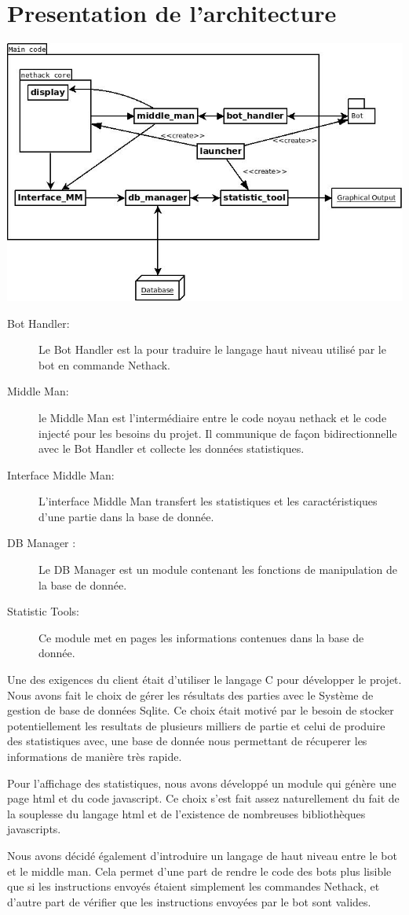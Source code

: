 \section{Presentation de l'architecture}

\includegraphics[width=140mm]{Images/new_archi.jpeg}

\begin{description}
\item[Bot Handler: ] Le Bot Handler est la pour traduire le langage haut niveau utilisé par le bot en commande Nethack.
\item[Middle Man: ] le Middle Man est l'intermédiaire entre le code noyau nethack et le code injecté pour les besoins du projet. Il communique de façon bidirectionnelle avec le Bot Handler et collecte les données statistiques.
\item[Interface Middle Man: ] L'interface Middle Man transfert les statistiques et les caractéristiques d'une partie dans la base de donnée.
\item[DB Manager :] Le DB Manager est un module contenant les fonctions de manipulation de la base de donnée.
\item[Statistic Tools:] Ce module met en pages les informations contenues dans la base de donnée.  
\end{description}

Une des exigences du client était d'utiliser le langage C pour développer le projet. Nous avons fait le choix de gérer les résultats des parties avec le Système de gestion de base de données Sqlite. Ce choix était motivé par le besoin de stocker potentiellement les resultats de plusieurs milliers de partie et celui de produire des statistiques avec, une base de donnée nous permettant de récuperer les informations de manière très rapide.

Pour l'affichage des statistiques, nous avons développé un module qui génère une page html et du code javascript. Ce choix s'est fait assez naturellement du fait de la souplesse du langage html et de l'existence de  nombreuses bibliothèques javascripts. 

Nous avons décidé également d'introduire un langage de haut niveau entre le bot et le middle man. Cela permet d'une part de rendre le code des bots plus lisible que si les instructions envoyés étaient simplement les commandes Nethack, et d'autre part de vérifier que les instructions envoyées par le bot sont valides. 
